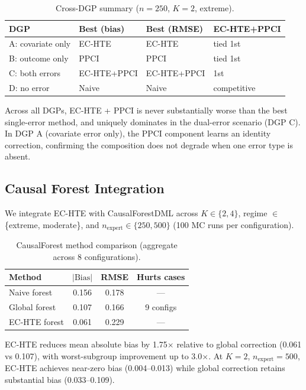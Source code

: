 \documentclass[11pt,a4paper]{article}
\begin{document}
\begin{table}[t]
\centering
\small
\caption{Cross-DGP summary ($n=250$, $K=2$, extreme).}
\label{tab:cross_dgp}
\begin{tabular}{@{}llll@{}}
\toprule
DGP & Best (bias) & Best (RMSE) & EC-HTE+PPCI \\
\midrule
A: covariate only & EC-HTE & EC-HTE & tied 1st \\
B: outcome only & PPCI & PPCI & tied 1st \\
C: both errors & EC-HTE+PPCI & EC-HTE+PPCI & 1st \\
D: no error & Naive & Naive & competitive \\
\bottomrule
\end{tabular}
\end{table}

Across all DGPs, EC-HTE + PPCI is never substantially worse than the best single-error method, and uniquely dominates in the dual-error scenario (DGP C).
In DGP A (covariate error only), the PPCI component learns an identity correction, confirming the composition does not degrade when one error type is absent.


\subsection{Causal Forest Integration}\label{sec:cf}

We integrate EC-HTE with CausalForestDML across $K \in \{2, 4\}$, regime $\in$ \{extreme, moderate\}, and $n_{\text{expert}} \in \{250, 500\}$ (100 MC runs per configuration).

\begin{table}[t]
\centering
\small
\caption{CausalForest method comparison (aggregate across 8 configurations).}
\label{tab:cf}
\begin{tabular}{@{}lccc@{}}
\toprule
Method & $|\text{Bias}|$ & RMSE & Hurts cases \\
\midrule
Naive forest & 0.156 & 0.178 & --- \\
Global forest & 0.107 & 0.166 & 9 configs \\
EC-HTE forest & 0.061 & 0.229 & --- \\
\bottomrule
\end{tabular}
\end{table}

EC-HTE reduces mean absolute bias by 1.75$\times$ relative to global correction (0.061 vs 0.107), with worst-subgroup improvement up to 3.0$\times$.
At $K=2$, $n_{\text{expert}} = 500$, EC-HTE achieves near-zero bias (0.004--0.013) while global correction retains substantial bias (0.033--0.109).
\end{document}
